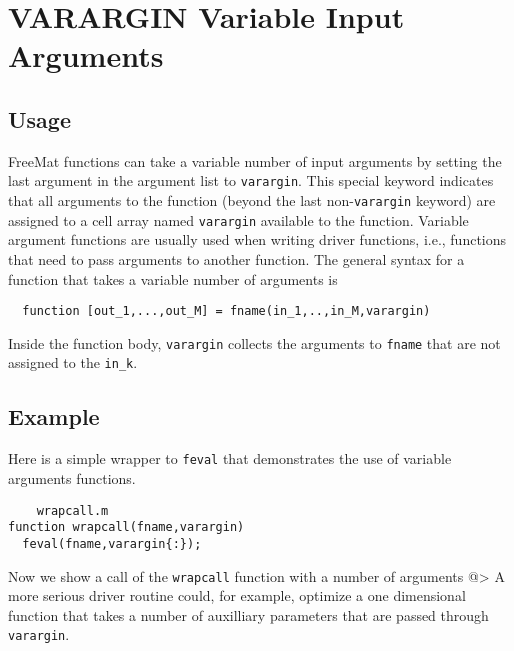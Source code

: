 \section{VARARGIN Variable Input Arguments}

\subsection{Usage}

FreeMat functions can take a variable number of input arguments
by setting the last argument in the argument list to \verb|varargin|.
This special keyword indicates that all arguments to the
function (beyond the last non-\verb|varargin| keyword) are assigned
to a cell array named \verb|varargin| available to the function.
Variable argument functions are usually used when writing 
driver functions, i.e., functions that need to pass arguments
to another function.  The general syntax for a function that
takes a variable number of arguments is
\begin{verbatim}
  function [out_1,...,out_M] = fname(in_1,..,in_M,varargin)
\end{verbatim}
Inside the function body, \verb|varargin| collects the arguments 
to \verb|fname| that are not assigned to the \verb|in_k|.
\subsection{Example}

Here is a simple wrapper to \verb|feval| that demonstrates the
use of variable arguments functions.
\begin{verbatim}
    wrapcall.m
function wrapcall(fname,varargin)
  feval(fname,varargin{:});
\end{verbatim}
Now we show a call of the \verb|wrapcall| function with a number
of arguments
@>
A more serious driver routine could, for example, optimize
a one dimensional function that takes a number of auxilliary
parameters that are passed through \verb|varargin|.
